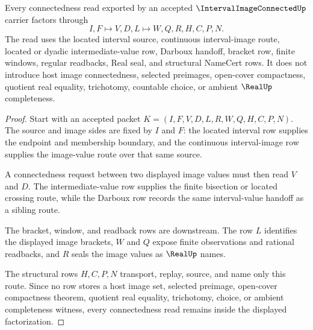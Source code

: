 \begin{theorem}
\label{thm:interval-image-connected-ivt-route}
Every connectedness read exported by an accepted $\IntervalImageConnectedUp$ carrier factors through
$$
I,F \longmapsto V,D,L \longmapsto W,Q,R,H,C,P,N .
$$
The read uses the located interval source, continuous interval-image route, located or dyadic intermediate-value row, Darboux handoff, bracket row, finite windows, regular readbacks, Real seal, and structural NameCert rows. It does not introduce host image connectedness, selected preimages, open-cover compactness, quotient real equality, trichotomy, countable choice, or ambient $\RealUp$ completeness.
\end{theorem}
\begin{proof}
Start with an accepted packet $K=(I,F,V,D,L,R,W,Q,H,C,P,N)$. The source and image sides are fixed by $I$ and $F$: the located interval row supplies the endpoint and membership boundary, and the continuous interval-image row supplies the image-value route over that same source.

A connectedness request between two displayed image values must then read $V$ and $D$. The intermediate-value row supplies the finite bisection or located crossing route, while the Darboux row records the same interval-value handoff as a sibling route.

The bracket, window, and readback rows are downstream. The row $L$ identifies the displayed image brackets, $W$ and $Q$ expose finite observations and rational readbacks, and $R$ seals the image values as $\RealUp$ names.

The structural rows $H,C,P,N$ transport, replay, source, and name only this route. Since no row stores a host image set, selected preimage, open-cover compactness theorem, quotient real equality, trichotomy, choice, or ambient completeness witness, every connectedness read remains inside the displayed factorization.
\end{proof}

